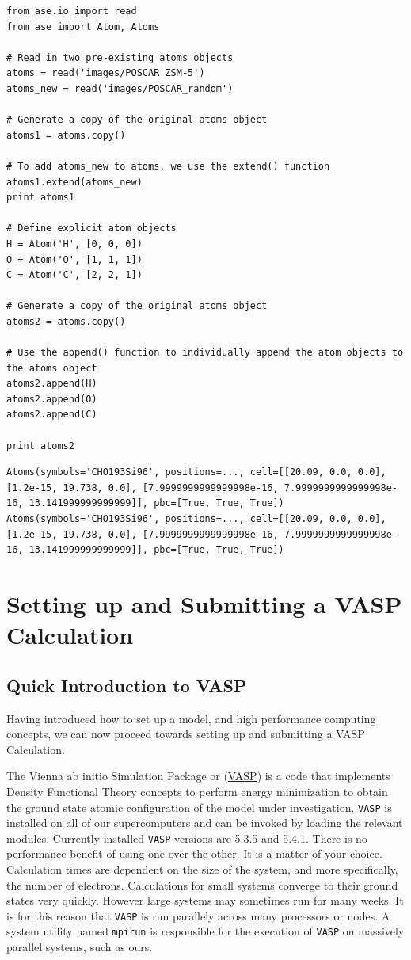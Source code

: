 \documentclass[11pt]{article}
\begin{document}
\begin{verbatim}
from ase.io import read
from ase import Atom, Atoms

# Read in two pre-existing atoms objects
atoms = read('images/POSCAR_ZSM-5')
atoms_new = read('images/POSCAR_random')

# Generate a copy of the original atoms object
atoms1 = atoms.copy()

# To add atoms_new to atoms, we use the extend() function
atoms1.extend(atoms_new)
print atoms1

# Define explicit atom objects
H = Atom('H', [0, 0, 0])
O = Atom('O', [1, 1, 1]) 
C = Atom('C', [2, 2, 1])

# Generate a copy of the original atoms object
atoms2 = atoms.copy()

# Use the append() function to individually append the atom objects to the atoms object
atoms2.append(H)
atoms2.append(O)
atoms2.append(C)

print atoms2
\end{verbatim}

\begin{verbatim}
Atoms(symbols='CHO193Si96', positions=..., cell=[[20.09, 0.0, 0.0], [1.2e-15, 19.738, 0.0], [7.9999999999999998e-16, 7.9999999999999998e-16, 13.141999999999999]], pbc=[True, True, True])
Atoms(symbols='CHO193Si96', positions=..., cell=[[20.09, 0.0, 0.0], [1.2e-15, 19.738, 0.0], [7.9999999999999998e-16, 7.9999999999999998e-16, 13.141999999999999]], pbc=[True, True, True])
\end{verbatim}

\section{Setting up and Submitting a VASP Calculation}
\label{sec-6}
\subsection{Quick Introduction to VASP}
\label{sec-6-1}
Having introduced how to set up a model, and high performance computing concepts, we can now proceed towards setting up and submitting a VASP Calculation.

The Vienna ab initio Simulation Package or (\href{https://www.vasp.at/}{VASP}) is a code that implements Density Functional Theory concepts to perform energy minimization to obtain the ground state atomic configuration of the model under investigation. \texttt{VASP} is installed on all of our supercomputers and can be invoked by loading the relevant modules. Currently installed \texttt{VASP} versions are 5.3.5 and 5.4.1. There is no performance benefit of using one over the other. It is a matter of your choice. Calculation times are dependent on the size of the system, and more specifically, the number of electrons. Calculations for small systems converge to their ground states very quickly. However large systems may sometimes run for many weeks. It is for this reason that \texttt{VASP} is run parallely across many processors or nodes. A system utility named \texttt{mpirun} is responsible for the execution of \texttt{VASP} on massively parallel systems, such as ours.
\end{document}
